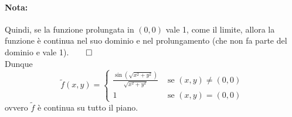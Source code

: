 \begin{example}
	\paragraph{Nota:} Quindi, se la funzione prolungata in $(0,0)$ vale 1, come il limite, allora la funzione è continua nel suo dominio e nel prolungamento (che non fa parte del dominio e vale 1).$\qed$\\
	Dunque 
	\begin{equation*}
		\tilde f(x,y)=
		\begin{cases}
			\frac{\sin(\sqrt{x^2+y^2})}{\sqrt{x^2+y^2}} &\text{ se } (x,y)\neq(0,0)\\
			1 & \text{ se } (x,y)=(0,0)
		\end{cases}
	\end{equation*}
	ovvero $\tilde f$ è continua su tutto il piano.
\end{example}

